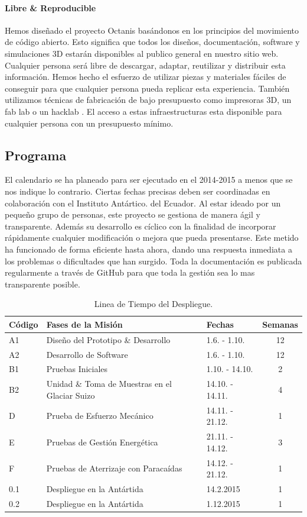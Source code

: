 \documentclass[a4paper,12pt]{article}
\begin{document}
\paragraph{Libre \& Reproducible} 
Hemos diseñado el proyecto Octanis basándonos en los principios del movimiento de código abierto. Esto significa que todos los diseños, documentación, software y simulaciones 3D estarán disponibles al publico general en nuestro sitio web. Cualquier persona será libre de descargar, adaptar, reutilizar y distribuir esta información. Hemos hecho el esfuerzo de utilizar piezas y materiales fáciles de conseguir para que cualquier persona pueda replicar esta experiencia. También utilizamos técnicas de fabricación de bajo presupuesto como impresoras 3D, un fab lab  \cite{fablab} o un hacklab \cite{hackerspace}. El acceso a estas infraestructuras esta disponible para cualquier persona con un presupuesto mínimo.
 

\subsection{Programa}

El calendario se ha planeado para ser ejecutado en el 2014-2015 a menos que se nos indique lo contrario. Ciertas fechas precisas deben ser coordinadas en colaboración con el Instituto Antártico.  del Ecuador. Al estar ideado por un pequeño grupo de personas, este proyecto se gestiona de manera ágil y transparente. Además su desarrollo es cíclico con la finalidad de incorporar rápidamente cualquier modificación o mejora que pueda presentarse. Este metido ha funcionado de forma eficiente hasta ahora, dando una respuesta inmediata a los problemas o dificultades que han surgido. Toda la documentación es publicada regularmente a través de GitHub  \cite{octanisgithub} para que toda la gestión sea lo mas transparente posible. 

\begin{table}[h!]
\centering
\begin{tabular}{ l | l | l | c }

\bfseries{Código} & \bfseries{Fases de la Misión} & \bfseries{Fechas} & \bfseries{Semanas} \\
\hline
A1 & Diseño del Prototipo \& Desarrollo & 1.6. - 1.10. & 12 \\
A2 & Desarrollo de Software & 1.6. - 1.10. & 12 \\
B1 & Pruebas Iniciales & 1.10. - 14.10. & 2  \\
B2 & Unidad \& Toma de Muestras en el Glaciar Suizo & 14.10. - 14.11. & 4 \\
D & Prueba de Esfuerzo Mecánico  & 14.11. - 21.12. & 1 \\
E & Pruebas de Gestión Energética & 21.11. - 14.12. & 3 \\
F & Pruebas de Aterrizaje con Paracaídas & 14.12. - 21.12. & 1 \\
0.1 & Despliegue en la Antártida  & 14.2.2015 &  1 \\
0.2 & Despliegue en la Antártida  & 1.12.2015 &  1 \\

\end{tabular}
\caption{Linea de Tiempo del Despliegue.}
\end{table}
\end{document}

